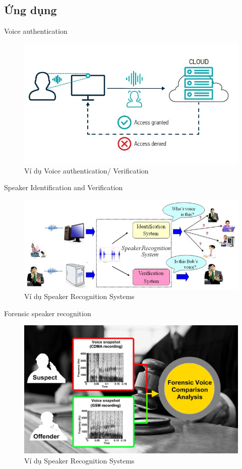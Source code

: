 \documentclass[11pt]{beamer}
\begin{document}
\subsection{Ứng dụng}
\begin{frame}{Voice authentication}
	\begin{figure}[h!]
		\includegraphics[width=0.9\linewidth]{images/voice_authentication.jpg}
		\caption{Ví dụ Voice authentication/ Verification}
		\label{fig:writing-thesis}
	\end{figure}
\end{frame}	
\begin{frame}{Speaker Identification and Verification}
	\begin{figure}[h!]
		\includegraphics[width=0.9\linewidth]{images/speaker_identification_verification.jpeg}
		\caption{Ví dụ Speaker Recognition Systems}
		\label{fig:writing-thesis}
	\end{figure}
\end{frame}
\begin{frame}{Forensic speaker recognition}
	\begin{figure}[h!]
		\includegraphics[width=0.9\linewidth]{images/forensic_voice.jpg}
		\caption{Ví dụ Speaker Recognition Systems}
		\label{fig:writing-thesis}
\end{figure}
\end{frame}
\end{document}
